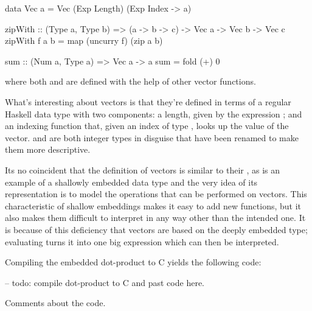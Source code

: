 \documentclass[../main.tex]{subfiles}
\begin{document}
\begin{code}
data Vec a = Vec (Exp Length) (Exp Index -> a)

zipWith :: (Type a, Type b) => (a -> b -> c) -> Vec a -> Vec b -> Vec c
zipWith f a b = map (uncurry f) (zip a b)

sum :: (Num a, Type a) => Vec a -> a
sum = fold (+) 0
\end{code}

\noindent where both  and  are defined with the help of other vector functions.

What's interesting about vectors is that they're defined in terms of a regular Haskell data type with two components: a length, given by the expression ; and an indexing function  that, given an index of type , looks up the value  of the vector.  and  are both integer types in disguise that have been renamed to make them more descriptive.

Its no coincident that the definition of vectors is similar to their , as  is an example of a shallowly embedded data type and the very idea of its representation is to model the operations that can be performed on vectors. This characteristic of shallow embeddings makes it easy to add new functions, but it also makes them difficult to interpret in any way other than the intended one. It is because of this deficiency that vectors are based on the deeply embedded  type; evaluating  turns it into one big expression which can then be interpreted.

Compiling the embedded dot-product to C yields the following code:

\begin{code}
-- todo: compile dot-product to C and past code here.
\end{code}

Comments about the code.
\end{document}
